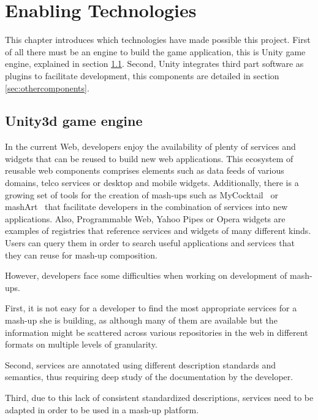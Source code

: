 
\chapter{Enabling Technologies}
\label{chap:enabling_technologies}
\begin{chapterintro}
This chapter introduces which technologies have made possible this project. First of all there must be an engine to build the game application, this is Unity game engine, explained in section \ref{sec:unity}. Second, Unity integrates third part software as plugins to facilitate development, this components are detailed in section \ref{sec:othercomponents}.
\end{chapterintro}

\cleardoublepage
\section{Unity3d game engine}
\label{sec:unity}
In the current Web, developers enjoy the availability of plenty of services and widgets that can be reused to build new web applications. This ecosystem of reusable web components comprises elements such as data feeds of various domains, telco services or desktop and mobile widgets. Additionally, there is a growing set of tools for the creation of mash-ups such as MyCocktail~\cite{iglesias2011combining} or mashArt~\cite{daniel2009hosted} that facilitate developers in the combination of services into new applications. Also, Programmable Web, Yahoo Pipes or Opera widgets are examples of registries that reference services and widgets of many different kinds. Users can query them in order to search useful applications and services that they can reuse for mash-up composition.

However, developers face some difficulties when working on development of mash-ups. 

First, it is not easy for a developer to find the most appropriate services for a mash-up she is building, as although many of them are available but the information might be scattered across various repositories in the web in different formats on multiple levels of granularity.

Second, services are annotated using different description standards and semantics, thus requiring deep study of the documentation by the developer.

Third, due to this lack of consistent standardized descriptions, services need to be adapted in order to be used in a mash-up platform. 

